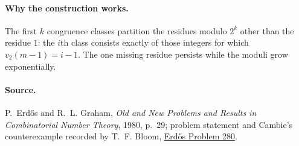 \documentclass[11pt]{article}
\begin{document}
\paragraph{Why the construction works.}
The first $k$ congruence classes partition the residues modulo $2^k$
other than the residue $1$: the $i$th class consists exactly of those
integers for which $v_2(m-1)=i-1$. The one missing residue persists
while the moduli grow exponentially.

\paragraph{Source.}
P.~Erd\H{o}s and R.~L. Graham, \emph{Old and New Problems and Results
in Combinatorial Number Theory}, 1980, p.~29; problem statement and
Cambie's counterexample recorded by T.~F. Bloom,
\href{https://www.erdosproblems.com/280}{Erd\H{o}s Problem 280}.
\end{document}
